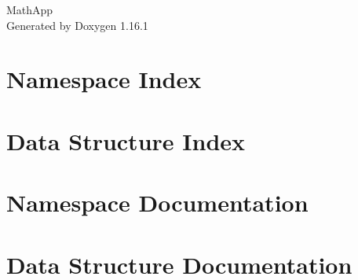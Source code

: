 \documentclass[twoside]{book}
\newcommand{\+}{\discretionary{\mbox{\scriptsize$\hookleftarrow$}}{}{}}
\newcommand{\clearemptydoublepage}{%
    \newpage{\pagestyle{empty}\cleardoublepage}%
  }
\begin{document}
  \raggedbottom
    \hypersetup{pageanchor=false,
                bookmarksnumbered=true,
                pdfencoding=unicode
               }
  \begin{titlepage}
  \vspace*{7cm}
  \begin{center}%
  {\Large Math\+App}\\
  \vspace*{1cm}
  {\large Generated by Doxygen 1.16.1}\\
  \end{center}
  \end{titlepage}
  \clearemptydoublepage
  \tableofcontents
  \clearemptydoublepage
  \hypersetup{pageanchor=true}
\chapter{Namespace Index}

\chapter{Data Structure Index}

\chapter{Namespace Documentation}

\chapter{Data Structure Documentation}

  \backmatter
  \newpage
  \clearemptydoublepage
  \printindex
\end{document}
